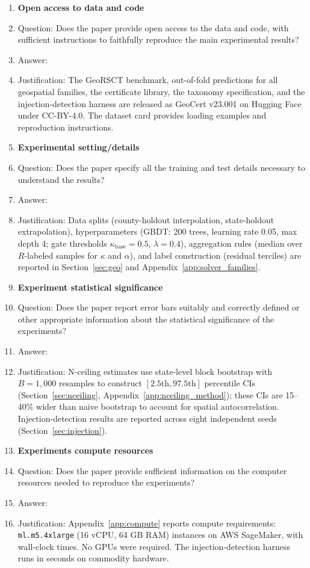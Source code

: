 \begin{enumerate}
\item {\bf Open access to data and code}
    \item[] Question: Does the paper provide open access to the data and code, with sufficient instructions to faithfully reproduce the main experimental results?
    \item[] Answer: \answerYes{}
    \item[] Justification: The GeoRSCT benchmark, out-of-fold predictions for all geospatial families, the certificate library, the taxonomy specification, and the injection-detection harness are released as GeoCert v23.001 on Hugging Face~\citep{geocert2026} under CC-BY-4.0. The dataset card provides loading examples and reproduction instructions.

\item {\bf Experimental setting/details}
    \item[] Question: Does the paper specify all the training and test details necessary to understand the results?
    \item[] Answer: \answerYes{}
    \item[] Justification: Data splits (county-holdout interpolation, state-holdout extrapolation), hyperparameters (GBDT: 200 trees, learning rate 0.05, max depth 4; gate thresholds $\kappa_{\text{base}}{=}0.5$, $\lambda{=}0.4$), aggregation rules (median over $R$-labeled samples for $\kappa$ and $\alpha$), and label construction (residual terciles) are reported in Section~\ref{sec:geo} and Appendix~\ref{app:solver_families}.

\item {\bf Experiment statistical significance}
    \item[] Question: Does the paper report error bars suitably and correctly defined or other appropriate information about the statistical significance of the experiments?
    \item[] Answer: \answerYes{}
    \item[] Justification: N-ceiling estimates use state-level block bootstrap with $B{=}1{,}000$ resamples to construct $[2.5\text{th}, 97.5\text{th}]$ percentile CIs (Section~\ref{sec:nceiling}, Appendix~\ref{app:nceiling_method}); these CIs are 15--40\% wider than naive bootstrap to account for spatial autocorrelation. Injection-detection results are reported across eight independent seeds (Section~\ref{sec:injection}).

\item {\bf Experiments compute resources}
    \item[] Question: Does the paper provide sufficient information on the computer resources needed to reproduce the experiments?
    \item[] Answer: \answerYes{}
    \item[] Justification: Appendix~\ref{app:compute} reports compute requirements: \texttt{ml.m5.4xlarge} (16 vCPU, 64 GB RAM) instances on AWS SageMaker, with wall-clock times. No GPUs were required. The injection-detection harness runs in seconds on commodity hardware.


\end{enumerate}

